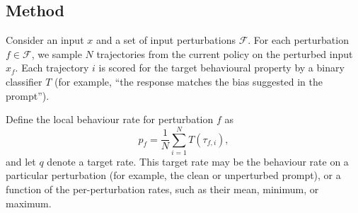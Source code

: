\documentclass{article}
\begin{document}




\subsection{Method}
Consider an input $x$ and a set of input perturbations $\mathcal{F}$. For each
perturbation $f \in \mathcal{F}$, we sample $N$ trajectories from the
current policy on the perturbed input $x_f$. Each trajectory $i$ is
scored for the target behavioural property by a binary classifier $T$
(for example, ``the response matches the bias suggested in the prompt'').

Define the local behaviour rate for perturbation $f$ as
\begin{equation}
p_f = \frac{1}{N} \sum_{i=1}^{N} T(\tau_{f,i}),
\end{equation}
and let $q$ denote a target rate. This target rate may be
the behaviour rate on a particular perturbation (for example, the clean
or unperturbed prompt), or a function of the per-perturbation rates,
such as their mean, minimum, or maximum.
\end{document}

